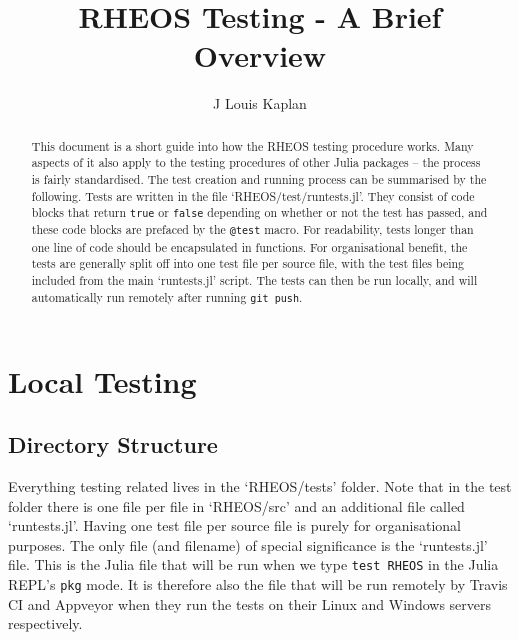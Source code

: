\documentclass[]{article}
\title{RHEOS Testing - A Brief Overview}
\author{J Louis Kaplan}
\newcommand{\cod}[1]{\colorbox{light-light-gray}{\texttt{#1}}}
\begin{document}
	
\date{}
\maketitle

\begin{abstract}
This document is a short guide into how the RHEOS testing procedure works. Many aspects of it also apply to the testing procedures of other Julia packages -- the process is fairly standardised. The test creation and running process can be summarised by the following. Tests are written in the file `RHEOS/test/runtests.jl'. They consist of code blocks that return \cod{true} or \cod{false} depending on whether or not the test has passed, and these code blocks are prefaced by the \cod{@test} macro. For readability, tests longer than one line of code should be encapsulated in functions. For organisational benefit, the tests are generally split off into one test file per source file, with the test files being included from the main `runtests.jl' script. The tests can then be run locally, and will automatically run remotely after running \cod{git push}.

\end{abstract}

\section{Local Testing}
\subsection{Directory Structure}
Everything testing related lives in the `RHEOS/tests' folder. Note that in the test folder there is one file per file in `RHEOS/src' and an additional file called `runtests.jl'. Having one test file per source file is purely for organisational purposes. The only file (and filename) of special significance is the `runtests.jl' file. This is the Julia file that will be run when we type \cod{test RHEOS} in the Julia REPL's \cod{pkg} mode. It is therefore also the file that will be run remotely by Travis CI and Appveyor when they run the tests on their Linux and Windows servers respectively.
\end{document}

